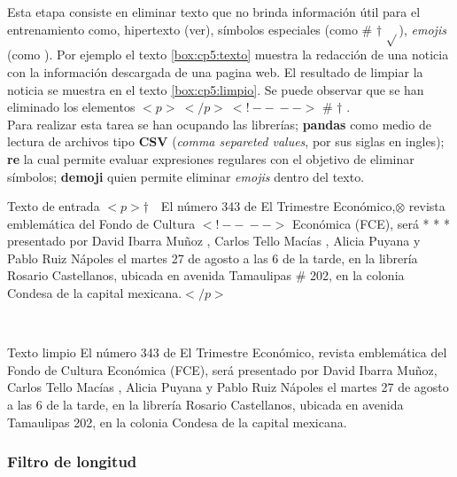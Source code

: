 Esta etapa consiste en eliminar texto que no brinda información útil para el entrenamiento como, hipertexto (ver), símbolos especiales (como \# $\dagger$ $\sqrt{ }$), \textit{emojis} (como \dSmiley \dCooley \dNinja). Por ejemplo el texto \ref{box:cp5:texto} muestra la redacción de una noticia con la información descargada de una pagina web. El resultado de limpiar la noticia se muestra en el texto \ref{box:cp5:limpio}. Se puede observar que se han eliminado los elementos $<p>\ </p>\ <!--\ -->$ \# $\dagger$ \dSmiley \dCooley \dInnocey.\\

Para realizar esta tarea se han ocupando las librerías; \textbf{pandas} como medio de lectura de archivos tipo \textbf{CSV} (\textit{comma separeted values}, por sus siglas en ingles); \textbf{re} la cual permite evaluar expresiones regulares con el objetivo de eliminar símbolos; \textbf{demoji} quien permite eliminar \textit{emojis} dentro del texto.\\

\begin{mygraybox}[label={box:cp5:texto}]{Texto de entrada} 
$<p>\dagger$$\ \ \ $ El número 343 de El Trimestre Económico,$\otimes$ revista emblemática del Fondo de Cultura 
$<!--\ -->$
Económica (FCE), será * * * presentado por David Ibarra Muñoz \dSmiley , Carlos Tello Macías \dCooley , Alicia Puyana \dInnocey y Pablo Ruiz Nápoles el martes 27 de agosto a las 6 de la tarde, en la librería Rosario Castellanos, ubicada en avenida Tamaulipas \# 202, en la colonia Condesa de la capital mexicana.$</p>$
\end{mygraybox}

\ \\

\begin{mygraybox}[label={box:cp5:limpio}]{Texto limpio} 
El número 343 de El Trimestre Económico, revista emblemática del Fondo de Cultura 
Económica (FCE), será presentado por David Ibarra Muñoz, Carlos Tello Macías , Alicia Puyana y Pablo Ruiz Nápoles el martes 27 de agosto a las 6 de la tarde, en la librería Rosario Castellanos, ubicada en avenida Tamaulipas 202, en la colonia Condesa de la capital mexicana.
\end{mygraybox}
\subsubsection{Filtro de longitud}

